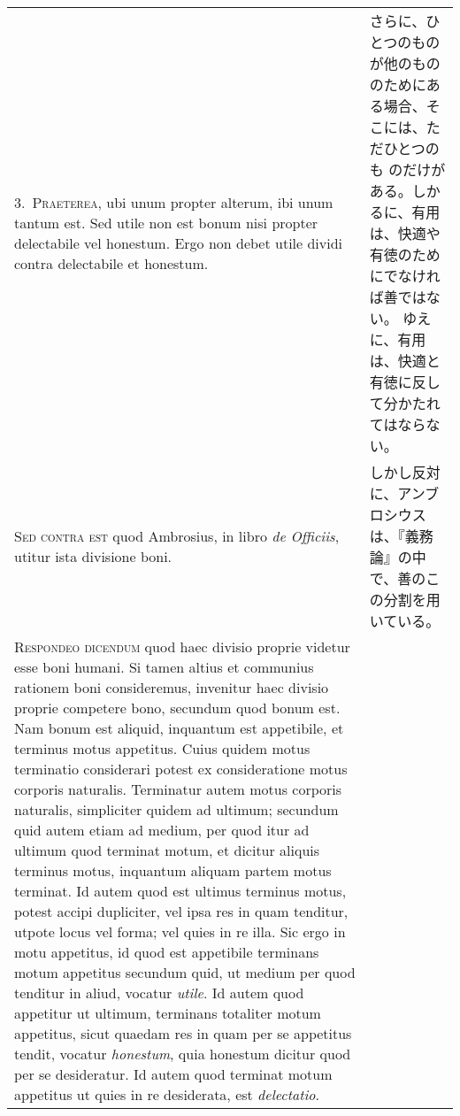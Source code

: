 \documentclass[10pt]{jsarticle} %
\begin{document}
\begin{longtable}{p{21em}p{21em}}
3.~{\scshape Praeterea}, ubi unum propter alterum, ibi unum tantum est. Sed
 utile non est bonum nisi propter delectabile vel honestum. Ergo non
 debet utile dividi contra delectabile et honestum.

&

さらに、ひとつのものが他のもののためにある場合、そこには、ただひとつのも
 のだけがある。しかるに、有用は、快適や有徳のためにでなければ善ではない。
 ゆえに、有用は、快適と有徳に反して分かたれてはならない。


\\

{\scshape Sed contra est} quod Ambrosius, in libro {\itshape de
 Officiis}, utitur ista divisione boni.

&


しかし反対に、アンブロシウスは、『義務論』の中で、善のこの分割を用いている。

\\

{\scshape Respondeo dicendum} quod haec divisio proprie videtur esse boni
 humani. Si tamen altius et communius rationem boni consideremus,
 invenitur haec divisio proprie competere bono, secundum quod bonum
 est. Nam bonum est aliquid, inquantum est appetibile, et terminus motus
 appetitus. Cuius quidem motus terminatio considerari potest ex
 consideratione motus corporis naturalis. Terminatur autem motus
 corporis naturalis, simpliciter quidem ad ultimum; secundum quid autem
 etiam ad medium, per quod itur ad ultimum quod terminat motum, et
 dicitur aliquis terminus motus, inquantum aliquam partem motus
 terminat. Id autem quod est ultimus terminus motus, potest accipi
 dupliciter, vel ipsa res in quam tenditur, utpote locus vel forma; vel
 quies in re illa. Sic ergo in motu appetitus, id quod est appetibile
 terminans motum appetitus secundum quid, ut medium per quod tenditur in
 aliud, vocatur {\itshape utile}. Id autem quod appetitur ut ultimum, terminans
 totaliter motum appetitus, sicut quaedam res in quam per se appetitus
 tendit, vocatur {\itshape honestum}, quia honestum dicitur quod per se
 desideratur. Id autem quod terminat motum appetitus ut quies in re
 desiderata, est {\itshape delectatio}.

&



\end{longtable}
\end{document}
